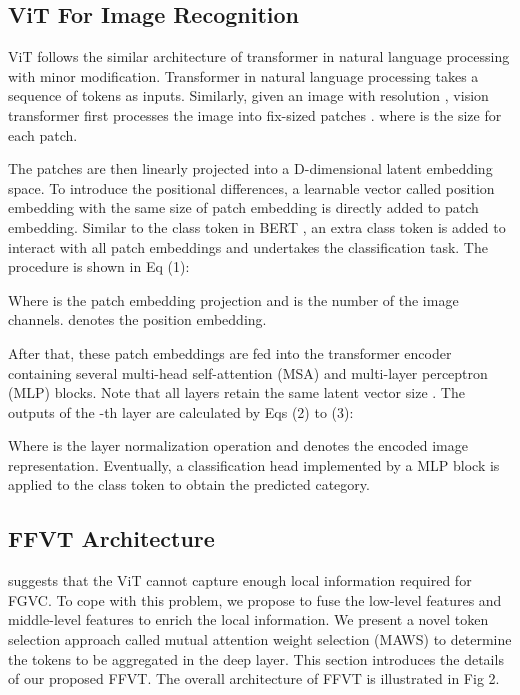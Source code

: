 \documentclass{bmvc2k}
\begin{document}
\subsection{ViT For Image Recognition}
ViT follows the similar architecture of transformer in natural language processing with minor modification. Transformer in natural language processing takes a sequence of tokens as inputs. Similarly, given an image with resolution ,  vision transformer first processes the image into  fix-sized patches . where  is the size for each patch. 
\par
The patches  are then linearly projected into a D-dimensional latent embedding space. To introduce the positional differences, a learnable vector called position embedding with the same size of patch embedding is directly added to patch embedding. Similar to the class token in BERT \cite{devlin2018bert}, an extra class token is added to interact with all patch embeddings and undertakes the classification task. The procedure is shown in Eq (1):

\noindent
Where  is the patch embedding projection and  is the number of the image channels.  denotes the position embedding.
\par
After that, these patch embeddings are fed into the transformer encoder containing several multi-head self-attention (MSA) and multi-layer perceptron (MLP) blocks. Note that all layers retain the same latent vector size . The outputs of the -th layer are calculated by Eqs (2) to (3):


\noindent
Where  is the layer normalization operation and  denotes the encoded image representation. Eventually, a classification head implemented by a MLP block is applied to the class token  to obtain the predicted category.
\par

\subsection{FFVT Architecture}
\cite{he2021transfg} suggests that the ViT cannot capture enough local information required for FGVC. To cope with this problem, we propose to fuse the low-level features and middle-level features to enrich the local information. We present a novel token selection approach called mutual attention weight selection (MAWS) to determine the tokens to be aggregated in the deep layer. This section introduces the details of our proposed FFVT. The overall architecture of FFVT is illustrated in Fig 2.
\end{document}
